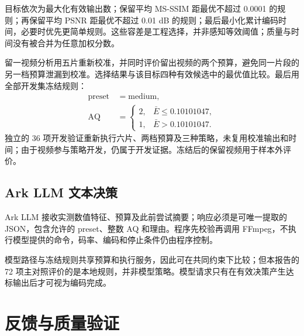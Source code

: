 \documentclass[UTF8,12pt,a4paper,twocolumn]{ctexart}
\begin{document}
目标依次为最大化有效输出数；保留平均 MS-SSIM 距最优不超过 0.0001 的规则；再保留平均 PSNR 距最优不超过 0.01 dB 的规则；最后最小化累计编码时间，必要时优先更简单规则。这些容差是工程选择，并非感知等效阈值；质量与时间没有被合并为任意加权分数。

留一视频分析用五片重新校准，并同时评价留出视频的两个预算，避免同一片段的另一档预算泄漏到校准。选择结果与该目标四种有效候选中的最优值比较。最后用全部开发集冻结规则：
\begin{equation}\begin{aligned}\text{preset}\,&=\text{medium},\\\text{AQ}\,&=\begin{cases}2,&\bar E\leq0.10101047,\\1,&\bar E>0.10101047.\end{cases}\end{aligned}\end{equation}
独立的 36 项开发验证重新执行六片、两档预算及三种策略，未复用校准输出和时间；由于视频参与策略开发，仍属于开发证据。冻结后的保留视频用于样本外评价。
\subsection{Ark LLM 文本决策}
Ark LLM 接收实测数值特征、预算及此前尝试摘要；响应必须是可唯一提取的 JSON，包含允许的 preset、整数 AQ 和理由。程序先校验再调用 FFmpeg，不执行模型提供的命令，码率、编码和停止条件仍由程序控制。

模型路径与冻结规则共享预算和执行服务，因此可在共同约束下比较；但本报告的 72 项主对照评价的是本地规则，并非模型策略。模型请求只有在有效决策产生达标输出后才可视为编码完成。
\section{反馈与质量验证}
\end{document}

